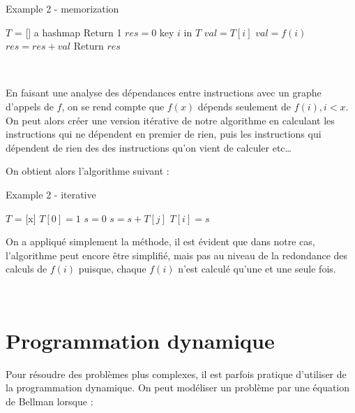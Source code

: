 \documentclass[
  paper=a4,
  ,captions=tableheading
]{scrartcl}
\begin{document}
\begin{algorithm}[H]
\caption{Example 2 - memorization}
\begin{algorithmic}[5]
\Statex
\State $T$ = [] a hashmap
      \State Return 1
    \EndIf
    \State $res = 0$
      \If key $i$ in $T$
        \State $val = T[i]$
      \Else
        \State $val = f(i)$
      \EndIf
      \State $res = res + val$
    \EndFor
  \State Return $res$
  \EndFunction
\end{algorithmic}
\end{algorithm}

~

En faisant une analyse des dépendances entre instructions avec un graphe
d'appels de \(f\), on se rend compte que \(f(x)\) dépends seulement de
\(f(i), i<x\). On peut alors créer une version itérative de notre
algorithme en calculant les instructions qui ne dépendent en premier de
rien, puis les instructions qui dépendent de rien des des instructions
qu'on vient de calculer etc\ldots{}

On obtient alors l'algorithme suivant :

\begin{algorithm}[H]
\caption{Example 2 - iterative}
\begin{algorithmic}[6]
\Statex
    \State $T$ = [x]
    \State $T[0] = 1$
      \State $s=0$
        \State $s = s + T[j]$
      \EndFor
      \State $T[i] = s$
    \EndFor
  \EndFunction
\end{algorithmic}
\end{algorithm}

On a appliqué simplement la méthode, il est évident que dans notre cas,
l'algorithme peut encore être simplifié, mais pas au niveau de la
redondance des calculs de \(f(i)\) puisque, chaque \(f(i)\) n'est
calculé qu'une et une seule fois.

~\\
\hspace*{0.333em}

\hypertarget{programmation-dynamique}{%
\section{Programmation dynamique}\label{programmation-dynamique}}

Pour résoudre des problèmes plus complexes, il est parfois pratique
d'utiliser de la programmation dynamique. On peut modéliser un problème
par une équation de Bellman lorsque :
\end{document}
